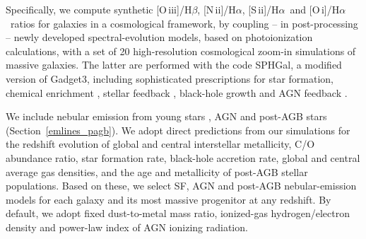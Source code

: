 \documentclass[fleqn,usenatbib]{mnras}
\newcommand{\oiiihb}{\hbox{[O\,{\sc iii}]/H$\beta$}}
\newcommand{\niiha}{\hbox{[N\,{\sc ii}]/H$\alpha$}}
\newcommand{\siiha}{\hbox{[S\,{\sc ii}]/H$\alpha$}}
\newcommand{\oiha}{\hbox{[O\,{\sc i}]/H$\alpha$}}
\begin{document}
%

Specifically, we compute synthetic  \oiiihb, \niiha, \siiha\ and
\oiha\ ratios for galaxies in a cosmological framework, by coupling --
in post-processing --  newly developed spectral-evolution models,
based on photoionization calculations, with a set of 20
high-resolution cosmological zoom-in simulations of massive
galaxies. The latter are performed with the code SPHGal, a modified
version of Gadget3, including sophisticated prescriptions for star
formation, chemical enrichment \citep{Aumer13}, stellar feedback
\citep{Nunez17}, black-hole growth and AGN feedback \citep{Choi16}. 

We include nebular emission from young stars \citep{Gutkin16}, AGN  
\citep{Feltre16} and post-AGB stars (Section~\ref{emlines_pagb}). We
adopt direct predictions from our simulations for the redshift
evolution of  global and central interstellar metallicity, C/O
abundance ratio, star formation  rate, black-hole accretion rate,
global and central average gas densities, and the age and metallicity
of post-AGB stellar populations. Based on these, we select SF, AGN and
post-AGB nebular-emission models for each galaxy  and its most massive
progenitor at any redshift. By default, we adopt  fixed dust-to-metal
mass ratio, ionized-gas hydrogen/electron density and  power-law index
of AGN ionizing radiation.  
\end{document}
